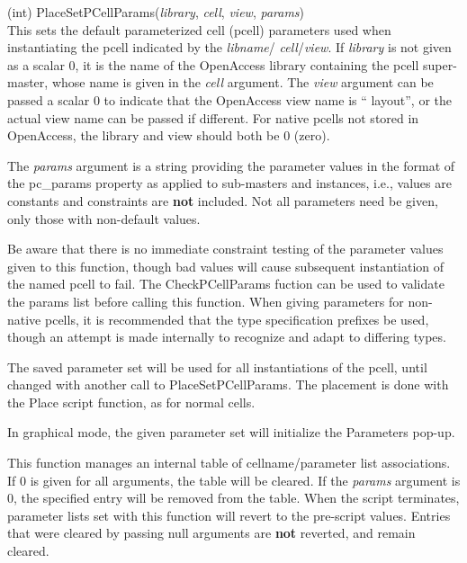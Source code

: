 \begin{description}
\item{(int) \vt PlaceSetPCellParams({\it library\/}, {\it cell\/},
{\it view\/}, {\it params\/})}\\
This sets the default parameterized cell (pcell) parameters used when
instantiating the pcell indicated by the {\it libname\/}/{\it
cell\/}/{\it view\/}.
If {\it library} is not given as a scalar 0, it is the name of the
OpenAccess library containing the pcell super-master, whose name is
given in the {\it cell} argument.  The {\it view} argument can be
passed a scalar 0 to indicate that the OpenAccess view name is ``{\vt
layout}'', or the actual view name can be passed if different.  For
{\Xic} native pcells not stored in OpenAccess, the library and view
should both be 0 (zero).

The {\it params} argument is a string providing the parameter values
in the format of the {\et pc\_params} property as applied to
sub-masters and instances, i.e., values are constants and constraints
are {\bf not} included.  Not all parameters need be given, only those
with non-default values.

Be aware that there is no immediate constraint testing of the
parameter values given to this function, though bad values will cause
subsequent instantiation of the named pcell to fail.  The {\vt
CheckPCellParams} fuction can be used to validate the params list
before calling this function.  When giving parameters for non-native
pcells, it is recommended that the type specification prefixes be
used, though an attempt is made internally to recognize and adapt to
differing types.

The saved parameter set will be used for all instantiations of the
pcell, until changed with another call to {\vt PlaceSetPCellParams}. 
The placement is done with the {\vt Place} script function, as for
normal cells.

In graphical mode, the given parameter set will initialize the {\cb
Parameters} pop-up.

This function manages an internal table of cellname/parameter list
associations.  If 0 is given for all arguments, the table will be
cleared.  If the {\it params} argument is 0, the specified entry will
be removed from the table.  When the script terminates, parameter
lists set with this function will revert to the pre-script values. 
Entries that were cleared by passing null arguments are {\bf not}
reverted, and remain cleared.


\end{description}
